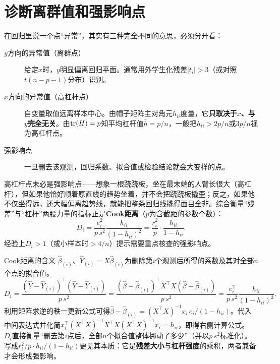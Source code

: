 \section{诊断离群值和强影响点}
在回归里说一个点“异常”，其实有三种完全不同的意思，必须分开看：
\begin{description}
\item[$y$方向的异常值（离群点）] 给定$x$时，$y$明显偏离回归平面。通常用外学生化残差$|t_i|>3$（或对照$t(n-p-1)$分布）识别。
\item[$x$方向的异常值（高杠杆点）] 自变量取值远离样本中心。由帽子矩阵主对角元$h_{ii}$度量，它\textbf{只取决于$x$、与$y$完全无关}。由$\operatorname{tr}(H)=p$知平均杠杆值$\bar h=p/n$，一般把$h_{ii}>2p/n$或$3p/n$视为高杠杆点。
\item[强影响点] 一旦删去该观测，回归系数、拟合值或检验结论就会大变样的点。
\end{description}
高杠杆点未必是强影响点——想象一根跷跷板，坐在最末端的人臂长很大（高杠杆），但如果他恰好顺着原直线的趋势坐着，并不会把跷跷板撬歪；反之，如果他不仅坐得远，还大幅偏离趋势线，就能把整条回归线撬得面目全非。综合衡量“残差”与“杠杆”两股力量的指标正是\textbf{Cook距离}（$p$为含截距的参数个数）：
\[
D_i=\frac{e_i^2}{p\,s^2}\frac{h_{ii}}{(1-h_{ii})^2}=\frac{r_i^2}{p}\cdot\frac{h_{ii}}{1-h_{ii}}.
\]
经验上$D_i>1$（或小样本时$>4/n$）提示需要重点核查的强影响点。

\begin{derivation}{Cook距离的含义}
$\widehat\beta_{(i)}$、$\widehat Y_{(i)}=X\widehat\beta_{(i)}$为删除第$i$个观测后所得的系数及其对全部$n$个点的拟合值。
\[
D_i=\frac{(\widehat Y-\widehat Y_{(i)})^\top(\widehat Y-\widehat Y_{(i)})}{p\,s^2}
=\frac{(\widehat\beta-\widehat\beta_{(i)})^\top X^\top X(\widehat\beta-\widehat\beta_{(i)})}{p\,s^2}
=\frac{e_i^2}{p\,s^2}\frac{h_{ii}}{(1-h_{ii})^2}.
\]
利用矩阵求逆的秩一更新公式可得$\widehat\beta-\widehat\beta_{(i)}=(X^\top X)^{-1}x_i\,e_i/(1-h_{ii})$。代入中间表达式并化简$x_i^\top(X^\top X)^{-1}X^\top X(X^\top X)^{-1}x_i=h_{ii}$，即得右侧计算公式。
$D_i$直接衡量“删去第$i$点后，全部$n$个拟合值整体挪动了多少”（并以$p\,s^2$标准化）。写成$r_i^2/p \cdot h_{ii}/(1-h_{ii})$更见其本质：它是\textbf{残差大小}与\textbf{杠杆强度}的乘积，两者兼备才会形成强影响。
\end{derivation}


